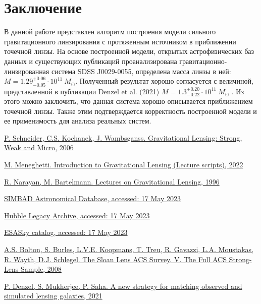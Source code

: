 \documentclass[12pt,a4paper]{article}
\begin{document}
\section*{Заключение}
В данной работе представлен алгоритм построения модели сильного гравитационного линзирования с протяженным источником в приближении точечной линзы. 
На основе построенной модели, открытых астрофизических баз данных и существующих публикаций проанализирована гравитационно-линзированная система SDSS J0029-0055, определена масса линзы в ней: $M = 1.29^{+0.06}_{-0.05}\cdot 10^{11}\ M_\odot$.
Полученный результат хорошо согласуется с величиной, представленной в публикации Denzel et al. (2021) $M = 1.3^{+0.20}_{-0.22} \cdot 10^{11}\ M_\odot$ \cite{denzel}.
Из этого можно заключить, что данная система хорошо описывается приближением точечной линзы.
Также этим подтверждается корректность построенной модели и ее применимость для анализа реальных систем.

\newpage

\begin{thebibliography}{}
    \href{https://extras.springer.com/?query=978-3-540-30309-1}{P. Schneider, C.S. Kochanek, J. Wambsganss. Gravitational Lensing: Strong, Weak and Micro, 2006}
    
    \href{https://ui.adsabs.harvard.edu/abs/2022iglp.book.....M/abstract}{M. Meneghetti. Introduction to Gravitational Lensing (Lecture scripts), 2022}

    \href{https://arxiv.org/abs/astro-ph/9606001}{R. Narayan, M. Bartelmann. Lectures on Gravitational Lensing, 1996}
 
    \href{http://simbad.u-strasbg.fr/simbad/}{SIMBAD Astronomical Database, accessed: 17 May 2023}

    \href{https://hla.stsci.edu/hlaview.html}{Hubble Legacy Archive, accessed: 17 May 2023}

    \href{https://sky.esa.int}{ESASky catalog, accessed: 17 May 2023}

    \href{https://iopscience.iop.org/article/10.1086/589327/pdf}{A.S. Bolton, S. Burles, L.V.E. Koopmans, T. Treu, R. Gavazzi, L.A. Moustakas, R. Wayth, D.J. Schlegel. The Sloan Lens ACS Survey. V. The Full ACS Strong-Lens Sample, 2008}
    
    \href{https://arxiv.org/pdf/2102.10114.pdf}{P. Denzel, S. Mukherjee, P. Saha. A new strategy for matching observed and simulated lensing galaxies, 2021}
   
    \end{thebibliography}
\end{document}
